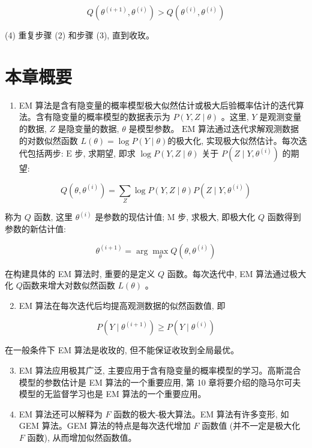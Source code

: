 \documentclass[10pt]{article}
\begin{document}
$$
Q\left(\theta^{(i+1)}, \theta^{(i)}\right)>Q\left(\theta^{(i)}, \theta^{(i)}\right)
$$

(4) 重复步骤 (2) 和步骤 (3), 直到收玫。

\section*{本章概要}
\begin{enumerate}
  \item EM 算法是含有隐变量的概率模型极大似然估计或极大后验概率估计的迭代算法。含有隐变量的概率模型的数据表示为 $P(Y, Z \mid \theta)$ 。这里, $Y$ 是观测变量的数据, $Z$ 是隐变量的数据, $\theta$ 是模型参数。 $\mathrm{EM}$ 算法通过迭代求解观测数据的对数似然函数 $L(\theta)=\log P(Y \mid \theta)$的极大化, 实现极大似然估计。每次迭代包括两步: $\mathrm{E}$ 步, 求期望, 即求 $\log P(Y, Z \mid \theta)$ 关于 $P\left(Z \mid Y, \theta^{(i)}\right)$ 的期望:
\end{enumerate}

$$
Q\left(\theta, \theta^{(i)}\right)=\sum_{Z} \log P(Y, Z \mid \theta) P\left(Z \mid Y, \theta^{(i)}\right)
$$

称为 $Q$ 函数, 这里 $\theta^{(i)}$ 是参数的现估计值; $\mathrm{M}$ 步, 求极大, 即极大化 $Q$ 函数得到参数的新估计值:

$$
\theta^{(i+1)}=\arg \max _{\theta} Q\left(\theta, \theta^{(i)}\right)
$$

在构建具体的 EM 算法时, 重要的是定义 $Q$ 函数。每次迭代中, EM 算法通过极大化 $Q$函数来增大对数似然函数 $L(\theta)$ 。

\begin{enumerate}
  \setcounter{enumi}{1}
  \item EM 算法在每次迭代后均提高观测数据的似然函数值, 即
\end{enumerate}

$$
P\left(Y \mid \theta^{(i+1)}\right) \geqslant P\left(Y \mid \theta^{(i)}\right)
$$

在一般条件下 EM 算法是收玫的, 但不能保证收玫到全局最优。

\begin{enumerate}
  \setcounter{enumi}{2}
  \item EM 算法应用极其广泛, 主要应用于含有隐变量的概率模型的学习。高斯混合模型的参数估计是 EM 算法的一个重要应用, 第 10 章将要介绍的隐马尔可夫模型的无监督学习也是 EM 算法的一个重要应用。

  \item EM 算法还可以解释为 $F$ 函数的极大-极大算法。EM 算法有许多变形, 如 GEM 算法。GEM 算法的特点是每次迭代增加 $F$ 函数值 (并不一定是极大化 $F$ 函数), 从而增加似然函数值。

\end{enumerate}
\end{document}
